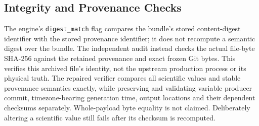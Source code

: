 \subsection{Integrity and Provenance Checks}
The engine's \texttt{digest\_match} flag compares the bundle's stored content-digest identifier with the stored provenance identifier; it does not recompute a semantic digest over the bundle. The independent audit instead checks the actual file-byte SHA-256 against the retained provenance and exact frozen Git bytes. This verifies this archived file's identity, not the upstream production process or its physical truth. The repaired verifier compares all scientific values and stable provenance semantics exactly, while preserving and validating variable producer commit, timezone-bearing generation time, output locations and their dependent checksums separately. Whole-payload byte equality is not claimed. Deliberately altering a scientific value still fails after its checksum is recomputed.
